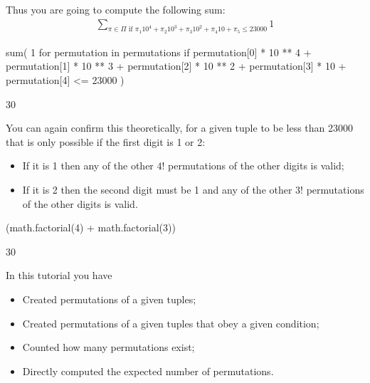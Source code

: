 Thus you are going to compute the following sum:
\begin{equation*}
\begin{split}
    \sum_{\pi \in \Pi \text{ if }\pi_1 10 ^ 4 + \pi_2 10 ^ 3 + \pi_3 10 ^ 2 + \pi_4 10 + \pi_5 \leq 23000} 1
\end{split}
\end{equation*}



\begin{pyin}
sum(
    1
    for permutation in permutations
    if permutation[0] * 10 ** 4
    + permutation[1] * 10 ** 3
    + permutation[2] * 10 ** 2
    + permutation[3] * 10
    + permutation[4]
    <= 23000
)
\end{pyin}





\begin{raw}
30
\end{raw}





You can again confirm this theoretically, for a given tuple to be less than 23000
that is only possible if the first digit is 1 or 2:
\begin{itemize}
\item 

If it is 1 then any of the other \(4!\) permutations of the other digits is
valid;

\item 

If it is 2 then the second digit must be 1 and any of the other \(3!\)
permutations of the other digits is valid.

\end{itemize}

\begin{pyin}
(math.factorial(4) + math.factorial(3))
\end{pyin}

\begin{raw}
30
\end{raw}

\begin{note}
In this tutorial you have
\begin{itemize}
\item 

Created permutations of a given tuples;

\item 

Created permutations of a given tuples that obey a given condition;

\item 

Counted how many permutations exist;

\item 

Directly computed the expected number of permutations.

\end{itemize}
\end{note}





